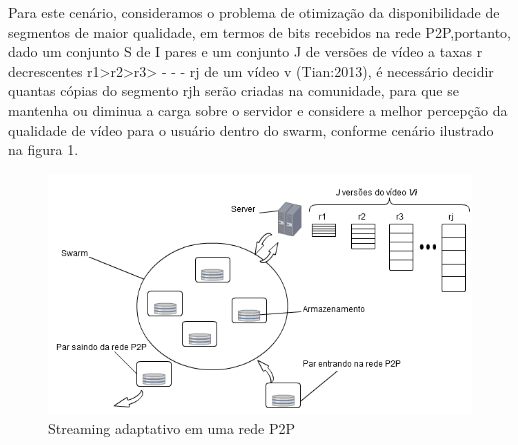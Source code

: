 \documentclass[
	12pt,				%
	oneside,			%
	a4paper,			%
	english,			%
	brazil				%
	]{abntex2ppgsi}
\begin{document}
Para este cenário, consideramos o problema de otimização da disponibilidade de segmentos de maior qualidade, em termos de bits recebidos na rede P2P,portanto, dado um conjunto S de  I pares e um conjunto J de versões de vídeo a taxas r decrescentes r1>r2>r3> - - - rj de um vídeo v (Tian:2013), é necessário decidir quantas cópias do segmento rjh serão criadas na comunidade, para que se mantenha ou diminua a carga sobre o servidor e considere a melhor percepção da qualidade de vídeo para o usuário dentro do swarm, conforme cenário ilustrado na figura 1.

% 
%
%
%
%

\begin{figure}[H]%
	\centering
 	  \caption{Streaming adaptativo em uma rede P2P}
		\includegraphics{figuras/Jversoes.png}
\end{figure}
\end{document}
